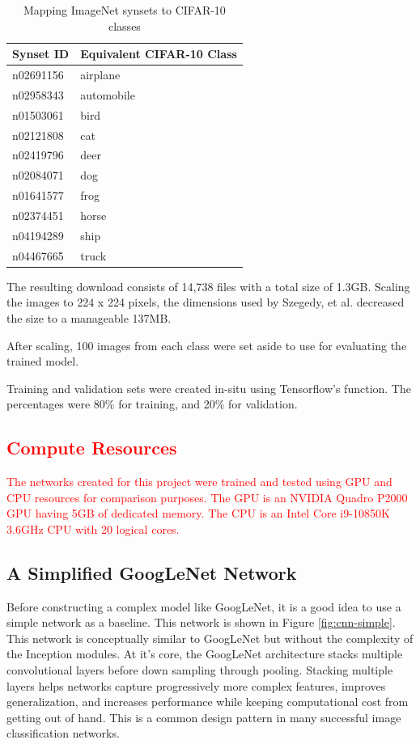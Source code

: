 \documentclass{article}
\begin{document}
\begin{table}[ht]
    \centering
    \begin{tabular}{ll}
    \hline
    \textbf{Synset ID} & \textbf{Equivalent CIFAR-10 Class} \\ \hline
    n02691156 & airplane \\ \hline
    n02958343 & automobile \\ \hline
    n01503061 & bird \\ \hline
    n02121808 & cat \\ \hline
    n02419796 & deer \\ \hline
    n02084071 & dog \\ \hline
    n01641577 & frog \\ \hline
    n02374451 & horse \\ \hline
    n04194289 & ship \\ \hline
    n04467665 & truck \\ \hline
    \end{tabular}
    \caption{Mapping ImageNet synsets to CIFAR-10 classes}
    \label{tab:synsets}
\end{table}

The resulting download consists of 14,738 files with a total size of 1.3GB. Scaling the images to 224 x 224 pixels, the dimensions used by Szegedy, et al. decreased the size to a manageable 137MB.

After scaling, 100 images from each class were set aside to use for evaluating the trained model.

Training and validation sets were created in-situ using Tensorflow's  function. The percentages were 80\% for training, and 20\% for validation.

\textcolor{red}{
\subsection{Compute Resources}
The networks created for this project were trained and tested using GPU and CPU resources for comparison purposes. The GPU is an NVIDIA Quadro P2000 GPU having 5GB of dedicated memory. The CPU is an Intel Core i9-10850K 3.6GHz CPU with 20 logical cores. }

\subsection{A Simplified GoogLeNet Network}
\label{subsec:simple_model}
Before constructing a complex model like GoogLeNet, it is a good idea to use a simple network as a baseline. This network is shown in Figure \ref{fig:cnn-simple}. This network is conceptually similar to GoogLeNet but without the complexity of the Inception modules. At it's core, the GoogLeNet architecture stacks multiple convolutional layers before down sampling through pooling. Stacking multiple layers helps networks capture progressively more complex features, improves generalization, and increases performance while keeping computational cost from getting out of hand. This is a common design pattern in many successful image classification networks\cite{simonyan2014very}.
\end{document}
